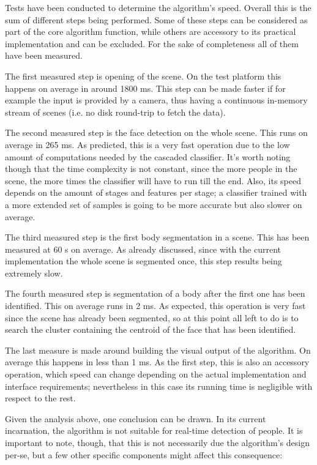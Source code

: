 \documentclass[a4paper,11pt,titlepage]{article}
\begin{document}
Tests have been conducted to determine the algorithm's speed. Overall this is
the sum of different steps being performed. Some of these steps can be
considered as part of the core algorithm function, while others are accessory to
its practical implementation and can be excluded. For the sake of completeness
all of them have been measured.

The first measured step is opening of the scene. On the test platform this
happens on average in around 1800 ms. This step can be made faster if for
example the input is provided by a camera, thus having a continuous in-memory
stream of scenes (i.e. no disk round-trip to fetch the data).

The second measured step is the face detection on the whole scene. This runs on
average in 265 ms. As predicted, this is a very fast operation due to the low
amount of computations needed by the cascaded classifier. It's worth noting
though that the time complexity is not constant, since the more people in the
scene, the more times the classifier will have to run till the end. Also, its
speed depends on the amount of stages and features per stage; a classifier
trained with a more extended set of samples is going to be more accurate but
also slower on average.

The third measured step is the first body segmentation in a scene. This has been
measured at 60 s on average. As already discussed, since with the current
implementation the whole scene is segmented once, this step results being
extremely slow.

The fourth measured step is segmentation of a body after the first one has been
identified. This on average runs in 2 ms. As expected, this operation is very
fast since the scene has already been segmented, so at this point all left to do
is to search the cluster containing the centroid of the face that has been
identified.

The last measure is made around building the visual output of the algorithm. On
average this happens in less than 1 ms. As the first step, this is also an
accessory operation, which speed can change depending on the actual
implementation and interface requirements; nevertheless in this case its running
time is negligible with respect to the rest.

Given the analysis above, one conclusion can be drawn. In its current
incarnation, the algorithm is not suitable for real-time detection of people.
It is important to note, though, that this is not necessarily due the
algorithm's design per-se, but a few other specific components might affect this
consequence:
\end{document}
